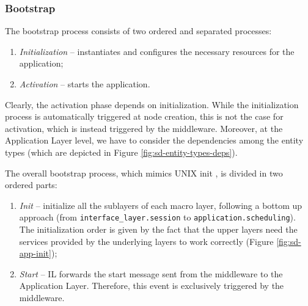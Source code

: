 \subsubsection{Bootstrap}

The bootstrap process consists of two ordered and separated processes:

\begin{enumerate}
  \item \textit{Initialization} -- instantiates and configures the necessary
    resources for the application;
  \item \textit{Activation} -- starts the application.
\end{enumerate}

Clearly, the activation phase depends on initialization.
While the initialization process is automatically triggered at node creation,
this is not the case for activation, which is instead triggered by the
middleware.
Moreover, at the Application Layer level, we have to consider the dependencies
among the entity types (which are depicted in Figure
\ref{fig:sd-entity-types-deps}).

The overall bootstrap process, which mimics UNIX init \cite{online-tlsag},
is divided in two ordered parts:
\begin{enumerate}
  \item \textit{Init} -- initialize all the sublayers of each macro layer,
  following a bottom up approach (from \verb|interface_layer.session| to
  \verb|application.scheduling|).
  The initialization order is given by the fact that the upper
  layers need the services provided by the underlying layers to work
  correctly (Figure \ref{fig:sd-app-init});
  \item \textit{Start} -- IL forwards the start message sent from the
  middleware to the Application Layer.
  Therefore, this event is exclusively triggered by the middleware.
\end{enumerate}

